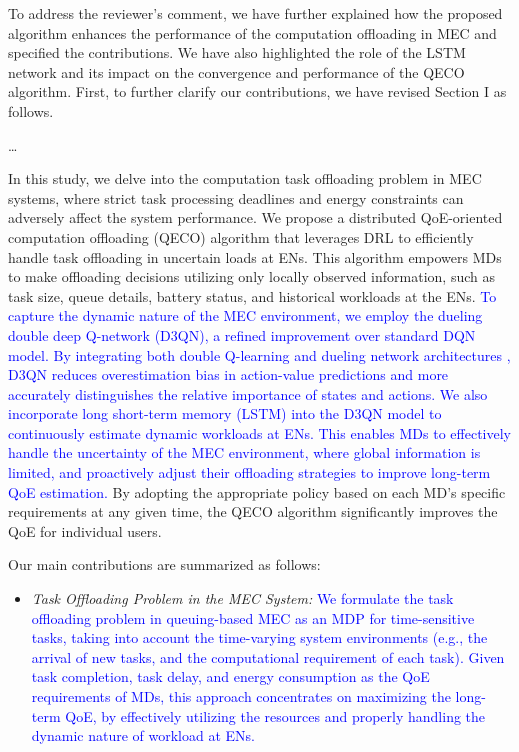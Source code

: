 \documentclass[12pt,draftclsnofoot,onecolumn]{IEEEtran}
\newcommand{\rev}[1]{{\color{blue}#1}} %
\newcommand{\rev}[1]{#1}
\newenvironment{my}[2]%
{\begin{list}{}%
{\setlength{\rightmargin}{#1}\setlength{\leftmargin}{#2}}%


 \item[]{}

} {\end{list}}
\begin{document}
\begin{enumerate}
To address the reviewer’s comment, we have further explained how the proposed algorithm enhances the performance of the computation offloading in MEC and specified the contributions. We have also highlighted the role of the LSTM network and its impact on the convergence and performance of the QECO algorithm. First, to further clarify our contributions, we have revised Section I as follows.

		\begin{my}{1cm}{1cm}
	\rev{
		{\dots\
			
			\color{black}

In this study, we delve into the computation task offloading problem in MEC systems, where strict task processing deadlines and energy constraints can adversely affect the system performance. We propose a distributed QoE-oriented computation offloading (QECO) algorithm that leverages DRL to efficiently handle task offloading in uncertain loads at ENs. This algorithm empowers MDs to make offloading decisions utilizing only locally observed information, such as task size, queue details, battery status, and historical workloads at the ENs. 
\textcolor{blue}{To capture the dynamic nature of the MEC environment, we employ the dueling double deep Q-network (D3QN), a refined improvement over standard DQN model. By integrating both double Q-learning \cite{van2016deep} and dueling network architectures \cite{wang2016dueling}, D3QN reduces overestimation bias in action-value predictions and more accurately distinguishes the relative importance of states and actions. We also incorporate long short-term memory (LSTM) \cite{hochreiter1997long} into the D3QN model to continuously estimate dynamic workloads at ENs. This enables MDs to effectively handle the uncertainty of the MEC environment, where global information is limited, and proactively adjust their offloading strategies to improve long-term QoE estimation.} By adopting the appropriate policy based on each MD’s specific requirements at any given time, the QECO algorithm significantly improves the QoE for individual users. 

Our main contributions are summarized as follows:

\begin{itemize}
	\item \textit{Task Offloading Problem in the MEC System:} \textcolor{blue}{ We formulate the task offloading problem in queuing-based MEC as an MDP for time-sensitive tasks, taking into account the time-varying system environments (e.g., the arrival of new tasks, and the computational requirement of each task). Given task completion, task delay, and energy consumption as the QoE requirements of MDs, this approach concentrates on maximizing the long-term QoE, by effectively utilizing the resources and properly handling the dynamic nature of workload at ENs.}
	

\end{itemize}}}
\end{my}
\end{enumerate}
\end{document}
